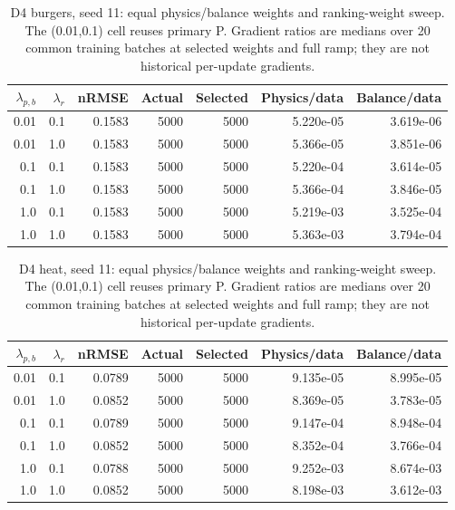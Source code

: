 \begin{table}[ht]
\centering\small
\caption{D4 burgers, seed 11: equal physics/balance weights and ranking-weight sweep. The (0.01,0.1) cell reuses primary P. Gradient ratios are medians over 20 common training batches at selected weights and full ramp; they are not historical per-update gradients.}\label{tab:weights_burgers}
\begin{tabular}{@{}rrrrrrr@{}}\toprule
$\lambda_{p,b}$ & $\lambda_r$ & nRMSE & Actual & Selected & Physics/data & Balance/data\\\midrule
0.01 & 0.1 & 0.1583 & 5000 & 5000 & 5.220e-05 & 3.619e-06\\
0.01 & 1.0 & 0.1583 & 5000 & 5000 & 5.366e-05 & 3.851e-06\\
0.1 & 0.1 & 0.1583 & 5000 & 5000 & 5.220e-04 & 3.614e-05\\
0.1 & 1.0 & 0.1583 & 5000 & 5000 & 5.366e-04 & 3.846e-05\\
1.0 & 0.1 & 0.1583 & 5000 & 5000 & 5.219e-03 & 3.525e-04\\
1.0 & 1.0 & 0.1583 & 5000 & 5000 & 5.363e-03 & 3.794e-04\\
\bottomrule\end{tabular}
\end{table}

\begin{table}[ht]
\centering\small
\caption{D4 heat, seed 11: equal physics/balance weights and ranking-weight sweep. The (0.01,0.1) cell reuses primary P. Gradient ratios are medians over 20 common training batches at selected weights and full ramp; they are not historical per-update gradients.}\label{tab:weights_heat}
\begin{tabular}{@{}rrrrrrr@{}}\toprule
$\lambda_{p,b}$ & $\lambda_r$ & nRMSE & Actual & Selected & Physics/data & Balance/data\\\midrule
0.01 & 0.1 & 0.0789 & 5000 & 5000 & 9.135e-05 & 8.995e-05\\
0.01 & 1.0 & 0.0852 & 5000 & 5000 & 8.369e-05 & 3.783e-05\\
0.1 & 0.1 & 0.0789 & 5000 & 5000 & 9.147e-04 & 8.948e-04\\
0.1 & 1.0 & 0.0852 & 5000 & 5000 & 8.352e-04 & 3.766e-04\\
1.0 & 0.1 & 0.0788 & 5000 & 5000 & 9.252e-03 & 8.674e-03\\
1.0 & 1.0 & 0.0852 & 5000 & 5000 & 8.198e-03 & 3.612e-03\\
\bottomrule\end{tabular}
\end{table}
